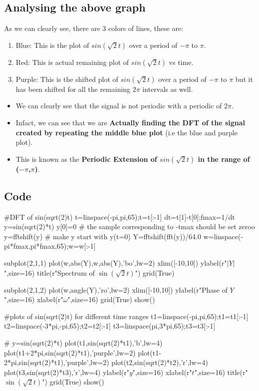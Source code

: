 \documentclass[11pt]{article}
\begin{document}
\subsection{Analysing the above graph}
As we can clearly see, there are 3 colors of lines, these are:
\begin{enumerate}
    \item Blue: This is the plot of $sin(\sqrt{2}t)$ over a period of $-\pi$ to $\pi$.
    \item Red: This is actual remaining plot of $sin(\sqrt{2}t)$ vs time.
    \item Purple: This is the shifted plot of $sin(\sqrt{2}t)$ over a period of $-\pi$ to $\pi$ but it has been shifted for all the remaining $2\pi$ intervals as well.
\end{enumerate}
\begin{itemize}
    \item We can clearly see that the signal is not periodic with a periodic of $2\pi$.
    \item Infact, we can see that we are \textbf{Actually finding the DFT of the signal created by repeating the middle blue plot} (i.e the blue and purple plot).
    \item This is known as the \textbf{Periodic Extension of $sin(\sqrt{2}t)$ in the range of ($-\pi$,$\pi$)}.
\end{itemize}

\subsection{Code}
\begin{python}
#DFT of sin(sqrt(2)t)
t=linspace(-pi,pi,65);t=t[:-1]
dt=t[1]-t[0];fmax=1/dt
y=sin(sqrt(2)*t)
y[0]=0 # the sample corresponding to -tmax should be set zeroo
y=fftshift(y) # make y start with y(t=0)
Y=fftshift(fft(y))/64.0
w=linspace(-pi*fmax,pi*fmax,65);w=w[:-1]

subplot(2,1,1)
plot(w,abs(Y),w,abs(Y),'bo',lw=2)
xlim([-10,10])
ylabel(r"$|Y|$",size=16)
title(r"Spectrum of $\sin\left(\sqrt{2}t\right)$")
grid(True)

subplot(2,1,2)
plot(w,angle(Y),'ro',lw=2)
xlim([-10,10])
ylabel(r"Phase of $Y$",size=16)
xlabel(r"$\omega$",size=16)
grid(True)
show()


#plots of sin(sqrt(2)t) for different time ranges
t1=linspace(-pi,pi,65);t1=t1[:-1]
t2=linspace(-3*pi,-pi,65);t2=t2[:-1]
t3=linspace(pi,3*pi,65);t3=t3[:-1]

# y=sin(sqrt(2)*t)
plot(t1,sin(sqrt(2)*t1),'b',lw=4)
plot(t1+2*pi,sin(sqrt(2)*t1),'purple',lw=2)
plot(t1-2*pi,sin(sqrt(2)*t1),'purple',lw=2)
plot(t2,sin(sqrt(2)*t2),'r',lw=4)
plot(t3,sin(sqrt(2)*t3),'r',lw=4)
ylabel(r"$y$",size=16)
xlabel(r"$t$",size=16)
title(r"$\sin\left(\sqrt{2}t\right)$")
grid(True)
show()
\end{python}
\end{document}

